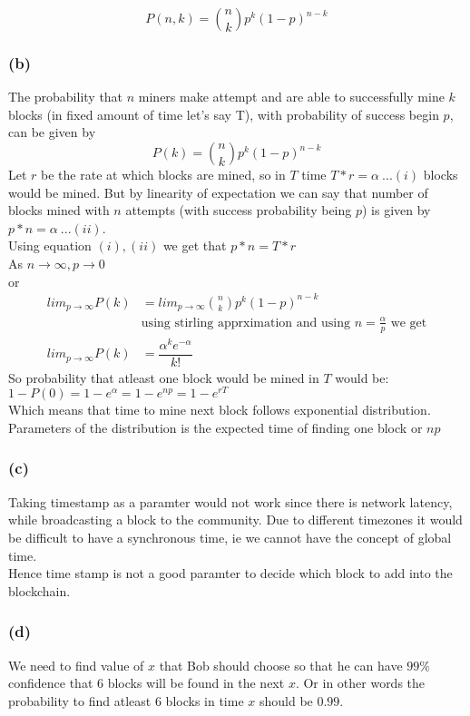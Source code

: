 \documentclass[a4paper]{article}
\begin{document}
$$P(n,k) = {n\choose k}p^k(1-p)^{n-k}$$

\subsubsection*{(b)}
The probability that $n$ miners make attempt and are able to successfully mine $k$ blocks
(in fixed amount of time let's say T), with probability of success begin $p$, can be given by
$$P(k) = {n\choose k}p^k(1-p)^{n-k}$$
Let $r$ be the rate at which blocks are mined, so in $T$ time $T*r = \alpha \:...(i)$  blocks would be mined.
But by linearity of expectation we can say that number of blocks mined with $n$ attempts
(with success probability being $p$) is given by $p*n = \alpha \: ...(ii)$. \\

Using equation $(i), (ii)$ we get that $p*n = T*r$ \\
As $n \to \infty, p\to 0$ \\
or
\begin{align*}
    lim_{p\to \infty} P(k) &= lim_{p\to \infty} {n\choose k}p^k(1-p)^{n-k} \\
    & \text{using stirling apprximation and using $n = \frac{\alpha}{p}$ we get} \\
    lim_{p\to \infty} P(k) &= \dfrac{\alpha^ke^{-\alpha}}{k!}
\end{align*}
So probability that atleast one block would be mined in $T$ would be: $1-P(0) = 1 - e^\alpha = 1-e^{np} = 1 - e^{rT}$\\

Which means that time to mine next block follows exponential distribution. \\
Parameters of the distribution is the expected time of finding one block or $np$

\subsubsection*{(c)}
Taking timestamp as a paramter would not work since there is network latency, while broadcasting a block to
the community. Due to different timezones it would be difficult to have a synchronous time, ie we cannot have
the concept of global time. \\

Hence time stamp is not a good paramter to decide which block to add into the blockchain.

\subsubsection*{(d)}
We need to find value of $x$ that Bob should choose so that he can have $99\%$ confidence that $6$ blocks will be
found in the next $x$. Or in other words the probability to find atleast $6$ blocks in time $x$ should be $0.99$. \\
\end{document}
